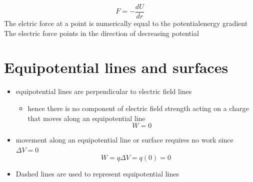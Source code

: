 \documentclass[a4paper, 10pt]{article}
\begin{document}
\begin{framed}
   \[
   F = - \frac{dU}{dr}
   \]
   The elctric force at a point is numerically equal to the potentialenergy gradient  \\
   The electric force points in the direction of decreasing potential
\end{framed}	


\section{Equipotential lines and surfaces}
\begin{itemize}
   \item equipotential lines are perpendicular to electric field lines
      \begin{itemize}
         \item hence there is no component of electric field strength acting on a charge that moves along an equipotential line
            \[
            W = 0
            \]
      \end{itemize}	
   \item movement along an equipotential line or surface requires no work since $\Delta V = 0$ 
      \[
         W = q\Delta V = q(0) = 0
      \]
   \item Dashed lines are used to represent equipotential lines

\end{itemize}	
\end{document}
